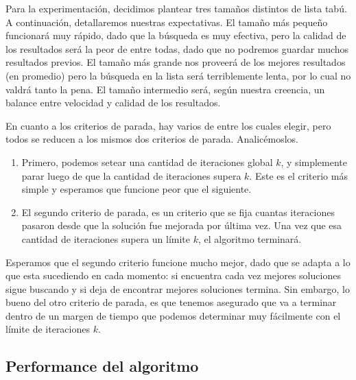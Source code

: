 Para la experimentación, decidimos plantear tres tamaños distintos de lista tabú.
A continuación, detallaremos nuestras expectativas.
El tamaño más pequeño funcionará muy rápido, dado que la búsqueda es muy efectiva, pero la calidad de los resultados será la peor de entre todas, dado que no podremos guardar muchos resultados previos.
El tamaño más grande nos proveerá de los mejores resultados (en promedio) pero la búsqueda en la lista será terriblemente lenta, por lo cual no valdrá tanto la pena.
El tamaño intermedio será, según nuestra creencia, un balance entre velocidad y calidad de los resultados.

En cuanto a los criterios de parada, hay varios de entre los cuales elegir, pero todos se reducen a los mismos dos criterios de parada. Analic\'emoslos.

\begin{enumerate}
  \item Primero, podemos setear una cantidad de iteraciones global $k$, y simplemente parar luego de que la cantidad de iteraciones supera $k$. Este es el criterio más simple y esperamos que funcione peor que el siguiente.
  \item El segundo criterio de parada, es un criterio que se fija cuantas iteraciones pasaron desde que la solución fue mejorada por última vez. Una vez que esa cantidad de iteraciones supera un límite $k$, el algoritmo terminará.
\end{enumerate}

Esperamos que el segundo criterio funcione mucho mejor, dado que se adapta a lo que esta sucediendo en cada momento: si encuentra cada vez mejores soluciones sigue buscando y si deja de encontrar mejores soluciones termina. Sin embargo, lo bueno del otro criterio de parada, es que tenemos asegurado que va a terminar dentro de un margen de tiempo que podemos determinar muy fácilmente con el límite de iteraciones $k$.





\subsection{Performance del algoritmo}


